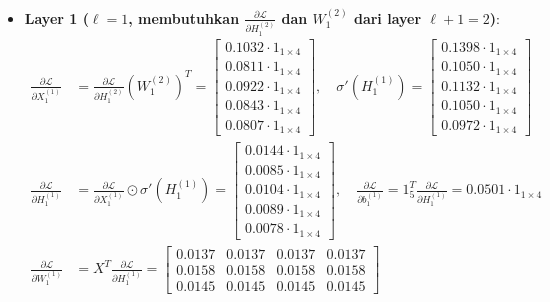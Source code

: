 \documentclass[11pt,a4paper]{article}
\def\mathbf#1{#1}%
\theoremstyle{plain}
\theoremstyle{definition}
\theoremstyle{remark}
\begin{document}
\begin{enumerate}
\begin{itemize}
\begin{align}
            \frac{\partial \mathcal{L}}{\partial W^{(2)}_1} &= \left( X^{(1)}_1 \right)^T \frac{\partial \mathcal{L}}{\partial H^{(2)}_1} = 0.0640 \cdot \mathbf{1}_{4 \times 6}, \qquad
            \frac{\partial \mathcal{L}}{\partial \mathbf{b}^{(2)}_1} = \mathbf{1}_5^T \frac{\partial \mathcal{L}}{\partial H^{(2)}_1} = 0.0736 \cdot \mathbf{1}_{1 \times 6}
        \end{align}
        \item \textbf{Layer 1 ($\ell = 1$, membutuhkan $\frac{\partial \mathcal{L}}{\partial H^{(2)}_1}$ dan $W^{(2)}_1$ dari layer $\ell+1 = 2$)}:
        \begin{align}
            \frac{\partial \mathcal{L}}{\partial X^{(1)}_1} &= \frac{\partial \mathcal{L}}{\partial H^{(2)}_1} \left( W^{(2)}_1 \right)^T = \begin{bmatrix} 0.1032 \cdot \mathbf{1}_{1 \times 4} \\ 0.0811 \cdot \mathbf{1}_{1 \times 4} \\ 0.0922 \cdot \mathbf{1}_{1 \times 4} \\ 0.0843 \cdot \mathbf{1}_{1 \times 4} \\ 0.0807 \cdot \mathbf{1}_{1 \times 4} \end{bmatrix}, \quad
            \sigma'\!\left(H^{(1)}_1\right) = \begin{bmatrix} 0.1398 \cdot \mathbf{1}_{1 \times 4} \\ 0.1050 \cdot \mathbf{1}_{1 \times 4} \\ 0.1132 \cdot \mathbf{1}_{1 \times 4} \\ 0.1050 \cdot \mathbf{1}_{1 \times 4} \\ 0.0972 \cdot \mathbf{1}_{1 \times 4} \end{bmatrix} \\[0.2em]
            \frac{\partial \mathcal{L}}{\partial H^{(1)}_1} &= \frac{\partial \mathcal{L}}{\partial X^{(1)}_1} \odot \sigma'\!\left(H^{(1)}_1\right) = \begin{bmatrix} 0.0144 \cdot \mathbf{1}_{1 \times 4} \\ 0.0085 \cdot \mathbf{1}_{1 \times 4} \\ 0.0104 \cdot \mathbf{1}_{1 \times 4} \\ 0.0089 \cdot \mathbf{1}_{1 \times 4} \\ 0.0078 \cdot \mathbf{1}_{1 \times 4} \end{bmatrix}, \quad
            \frac{\partial \mathcal{L}}{\partial \mathbf{b}^{(1)}_1} = \mathbf{1}_5^T \frac{\partial \mathcal{L}}{\partial H^{(1)}_1} = 0.0501 \cdot \mathbf{1}_{1 \times 4} \\[0.2em]
            \frac{\partial \mathcal{L}}{\partial W^{(1)}_1} &= X^T \frac{\partial \mathcal{L}}{\partial H^{(1)}_1} = \begin{bmatrix} 0.0137 & 0.0137 & 0.0137 & 0.0137 \\ 0.0158 & 0.0158 & 0.0158 & 0.0158 \\ 0.0145 & 0.0145 & 0.0145 & 0.0145 \end{bmatrix}
        \end{align}
    \end{itemize}


\end{enumerate}
\end{document}
